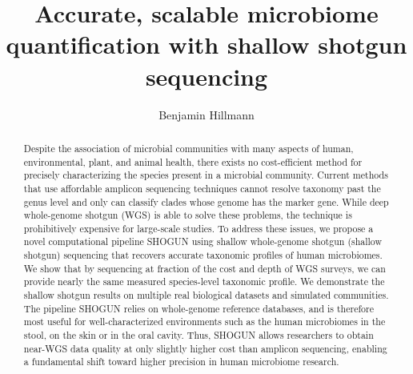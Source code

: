 \documentclass[manuscript, screen, review=True]{acmart}
\begin{document}
\title{Accurate, scalable microbiome quantification with shallow shotgun sequencing}

\author{Benjamin Hillmann}


\renewcommand{\shortauthors}{Benjamin Hillmann}

\begin{abstract}
Despite the association of microbial communities with many aspects of human, environmental, plant, and animal health, there exists no cost-efficient method for precisely characterizing the species present in a microbial community. Current methods that use affordable amplicon sequencing techniques cannot resolve taxonomy past the genus level and only can classify clades whose genome has the marker gene. While deep whole-genome shotgun (WGS) is able to solve these problems, the technique is prohibitively expensive for large-scale studies. To address these issues, we propose a novel computational pipeline SHOGUN using shallow whole-genome shotgun (shallow shotgun) sequencing that recovers accurate taxonomic profiles of human microbiomes. We show that by sequencing at fraction of the cost and depth of WGS surveys, we can provide nearly the same measured species-level taxonomic profile. We demonstrate the shallow shotgun results on multiple real biological datasets and simulated communities. The pipeline SHOGUN relies on whole-genome reference databases, and is therefore most useful for well-characterized environments such as the human microbiomes in the stool, on the skin or in the oral cavity. Thus, SHOGUN allows researchers to obtain near-WGS data quality at only slightly higher cost than amplicon sequencing, enabling a fundamental shift toward higher precision in human microbiome research.
\end{abstract}

%
%





\maketitle







\appendix


\newpage

\end{document}
